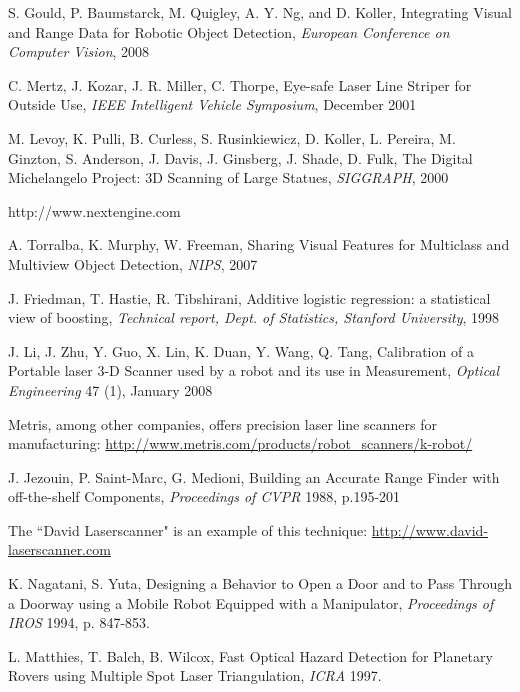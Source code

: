 \documentclass[letterpaper, 10 pt, conference]{ieeeconf}  %
\begin{document}
\begin{thebibliography}{99}

S. Gould, P. Baumstarck, M. Quigley, A. Y. Ng, and D. Koller, Integrating Visual and Range Data for Robotic Object Detection, {\it European Conference on Computer Vision}, 2008

C. Mertz, J. Kozar, J. R. Miller, C. Thorpe, Eye-safe Laser Line Striper for Outside Use, {\it IEEE Intelligent Vehicle Symposium}, December 2001

M. Levoy, K. Pulli, B. Curless, S. Rusinkiewicz, D. Koller, L. Pereira, M. Ginzton, S. Anderson, J. Davis, J. Ginsberg, J. Shade, D. Fulk, The Digital Michelangelo Project: 3D Scanning of Large Statues, {\it SIGGRAPH}, 2000

http://www.nextengine.com

A. Torralba, K. Murphy, W. Freeman, Sharing Visual Features for Multiclass and Multiview Object Detection, {\it NIPS}, 2007

J. Friedman, T. Hastie, R. Tibshirani, Additive logistic regression: a statistical view of boosting,
{\it Technical report, Dept. of Statistics, Stanford University}, 1998

J. Li, J. Zhu, Y. Guo, X. Lin, K. Duan, Y. Wang, Q. Tang, Calibration of a Portable laser 3-D Scanner used by a robot and its use in Measurement, {\it Optical Engineering} 47 (1), January 2008

Metris, among other companies, offers precision laser line scanners for manufacturing: \url{http://www.metris.com/products/robot_scanners/k-robot/}

J. Jezouin, P. Saint-Marc, G. Medioni, Building an Accurate Range Finder with
off-the-shelf Components, {\it Proceedings of CVPR} 1988, p.195-201

The ``David Laserscanner" is an example of this technique: \url{http://www.david-laserscanner.com}

K. Nagatani, S. Yuta, Designing a Behavior to Open a Door and to Pass Through a Doorway using a Mobile Robot Equipped with a Manipulator, {\it Proceedings of IROS} 1994, p. 847-853.

L. Matthies, T. Balch, B. Wilcox, Fast Optical Hazard Detection for Planetary Rovers using Multiple Spot Laser Triangulation, {\it ICRA} 1997.


\end{thebibliography}
\end{document}
